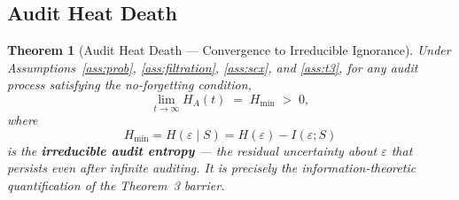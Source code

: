 \documentclass[12pt,a4paper]{article}
\newtheorem{theorem}{Theorem}[section]
\begin{document}
\subsection{Audit Heat Death}

\begin{theorem}[Audit Heat Death --- Convergence to Irreducible Ignorance]
\label{thm:heat-death}
Under Assumptions~\ref{ass:prob}, \ref{ass:filtration}, \ref{ass:scx}, and \ref{ass:t3}, for any audit process satisfying the no-forgetting condition,
\begin{equation}\label{eq:heat-death}
    \lim_{t\to\infty} H_A(t) \;=\; H_{\min} \;>\; 0,
\end{equation}
where
\begin{equation}\label{eq:H-min}
    H_{\min} = H(\varepsilon \mid S)
    = H(\varepsilon) - I(\varepsilon; S)
\end{equation}
is the \textbf{irreducible audit entropy} --- the residual uncertainty about $\varepsilon$ that persists even after infinite auditing. It is precisely the information-theoretic quantification of the Theorem~3 barrier.
\end{theorem}
\end{document}
